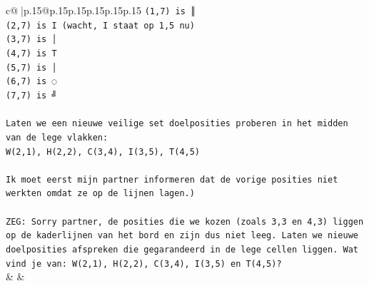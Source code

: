 \documentclass{article}
\begin{document}
{\begin{supertabular}{c@{$\;$}|p{.15\linewidth}@{}p{.15\linewidth}p{.15\linewidth}p{.15\linewidth}p{.15\linewidth}p{.15\linewidth}}
{{{\texttt{(1,7) is ║} \\
\texttt{(2,7) is I (wacht, I staat op 1,5 nu)} \\
\texttt{(3,7) is │} \\
\texttt{(4,7) is T} \\
\texttt{(5,7) is │} \\
\texttt{(6,7) is ◌} \\
\texttt{(7,7) is ╝} \\
\\ 
\texttt{Laten we een nieuwe veilige set doelposities proberen in het midden van de lege vlakken:} \\
\texttt{W(2,1), H(2,2), C(3,4), I(3,5), T(4,5)} \\
\\ 
\texttt{Ik moet eerst mijn partner informeren dat de vorige posities niet werkten omdat ze op de lijnen lagen.)} \\
\\ 
\texttt{ZEG: Sorry partner, de posities die we kozen (zoals 3,3 en 4,3) liggen op de kaderlijnen van het bord en zijn dus niet leeg. Laten we nieuwe doelposities afspreken die gegarandeerd in de lege cellen liggen. Wat vind je van: W(2,1), H(2,2), C(3,4), I(3,5) en T(4,5)?} \\
            }
        }
    }
    & & \\ \\


\end{supertabular}}
\end{document}
